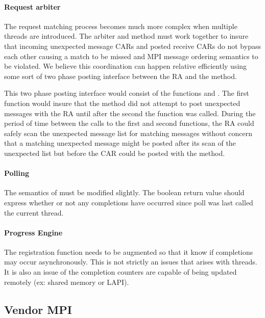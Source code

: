 \paragraph{Request arbiter} The request matching process becomes much more
complex when multiple threads are introduced.  The arbiter and method must work
together to insure that incoming unexpected message CARs and posted receive
CARs do not bypass each other causing a match to be missed and MPI message
ordering semantics to be violated.  We believe this coordination can happen
relative efficiently using some sort of two phase posting interface between the
RA and the method.

This two phase posting interface would consist of the functions
 and .  The first
function would insure that the method did not attempt to post unexpected
messages with the RA until after the second the function was called.  During
the period of time between the calls to the first and second functions, the RA
could safely scan the unexpected message list for matching messages without
concern that a matching unexpected message might be posted after its scan of
the unexpected list but before the CAR could be posted with the method.

\paragraph{Polling} The semantics of  must be modified
slightly.  The boolean return value should express whether or not any
completions have occurred since poll was last called the current thread.

\paragraph{Progress Engine} The registration function needs to be augmented so
that it know if completions may occur asynchronously.  This is not strictly an
issues that arises with threads.  It is also an issue of the completion
counters are capable of being updated remotely (ex: shared memory or LAPI).


\subsection{Vendor MPI}

